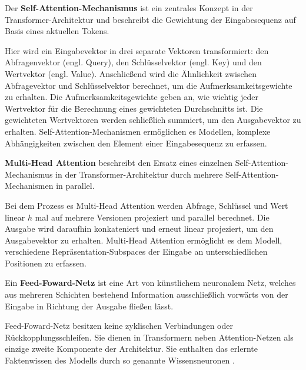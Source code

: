 \begin{definition}\label{def:self-attention-mechanismus}
    Der \textbf{Self-Attention-Mechanismus} ist ein zentrales Konzept in der Transformer-Architektur und beschreibt die Gewichtung der Eingabesequenz auf Basis eines aktuellen Tokens.
\end{definition}
Hier wird ein Eingabevektor in drei separate Vektoren transformiert:
den Abfragenvektor (engl. Query), den Schlüsselvektor (engl. Key) und den Wertvektor (engl. Value).
Anschließend wird die Ähnlichkeit zwischen Abfragevektor und Schlüsselvektor berechnet,
um die Aufmerksamkeitsgewichte zu erhalten.
Die Aufmerksamkeitsgewichte geben an, wie wichtig jeder Wertvektor für die Berechnung eines gewichteten
Durchschnitts ist. Die gewichteten Wertvektoren werden schließlich summiert, um den Ausgabevektor zu erhalten.
Self-Attention-Mechanismen ermöglichen es Modellen, komplexe Abhängigkeiten zwischen den Element einer Eingabesequenz zu erfassen.\\

\begin{definition}\label{def:multi-head-attention}
    \textbf{Multi-Head Attention} beschreibt den Ersatz eines einzelnen Self-Attention-Mechanismus in der Transformer-Architektur durch mehrere Self-Attention-Mechanismen in parallel.
\end{definition}
Bei dem Prozess es Multi-Head Attention werden Abfrage, Schlüssel und Wert linear $h$ mal auf mehrere Versionen projeziert und parallel berechnet. Die Ausgabe wird daraufhin konkateniert und erneut linear projeziert, um den Ausgabevektor zu erhalten. Multi-Head Attention ermöglicht es dem Modell, verschiedene Repräsentation-Subspaces der Eingabe an unterschiedlichen Positionen zu erfassen.

\begin{definition}\label{def:feed-forward-netz}
    Ein \textbf{Feed-Foward-Netz} ist eine Art von künstlichem neuronalem Netz, welches aus mehreren Schichten bestehend Information ausschließlich vorwärts von der Eingabe
    in Richtung der Ausgabe fließen lässt.
\end{definition}
Feed-Foward-Netz besitzen keine zyklischen Verbindungen oder Rückkopplungsschleifen.
Sie dienen in Transformern neben Attention-Netzen als einzige zweite Komponente der Architektur.
Sie enthalten das erlernte Faktenwissen des Modells durch so genannte Wissensneuronen \citep{knowledge_neurons}.\\

